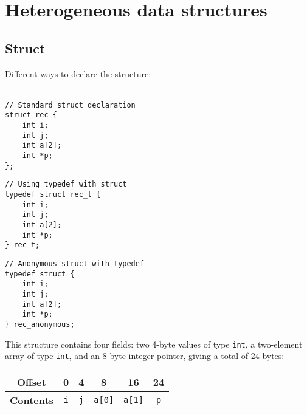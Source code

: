 \section{Heterogeneous data structures}
\subsection{Struct}
Different ways to declare the structure: \\
\\
\noindent
\begin{minipage}{0.45\textwidth}
\begin{verbatim}
// Standard struct declaration
struct rec {
    int i;
    int j;
    int a[2];
    int *p;
};
\end{verbatim}
\end{minipage}
\hfill
\begin{minipage}{0.45\textwidth}
\begin{verbatim}
// Using typedef with struct
typedef struct rec_t {
    int i;
    int j;
    int a[2];
    int *p;
} rec_t;
\end{verbatim}
\end{minipage}
%
\vspace{1em}
%
\noindent
\begin{minipage}{0.45\textwidth}
\begin{verbatim}
// Anonymous struct with typedef
typedef struct {
    int i;
    int j;
    int a[2];
    int *p;
} rec_anonymous;
\end{verbatim}
\end{minipage}
%
\vspace{1em}
%
This structure contains four fields: two 4-byte values of type \texttt{int}, 
a two-element array of type \texttt{int}, and an 8-byte integer pointer, 
giving a total of 24 bytes:
%
\begin{table}[h]
    \centering
    \renewcommand{\arraystretch}{1.5}
    \begin{tabular}{c c c c c c}
        \toprule
        \textbf{Offset} & 0 & 4 & 8 & 16 & 24 \\
        \midrule
        \textbf{Contents} & \texttt{i} & \texttt{j} & \texttt{a[0]} & \texttt{a[1]} & \texttt{p} \\
        \bottomrule
    \end{tabular}
\end{table}
